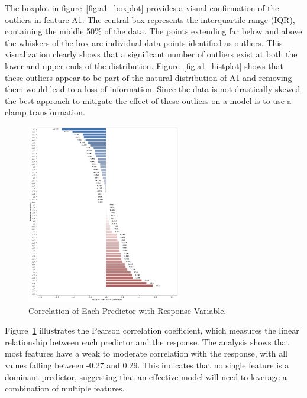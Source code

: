 \documentclass[11pt]{report}
\begin{document}
The boxplot in figure~\ref{fig:a1_boxplot} provides a visual confirmation of the outliers in feature A1. The central box represents the interquartile range (IQR), containing the middle 50\% of the data. The points extending far below and above the whiskers of the box are individual data points identified as outliers. This visualization clearly shows that a significant number of outliers exist at both the lower and upper ends of the distribution. Figure~\ref{fig:a1_histplot} shows that these outliers appear to be part of the natural distribution of A1 and removing them would lead to a loss of information. Since the data is not drastically skewed the best approach to mitigate the effect of these outliers on a model is to use a clamp transformation.

\begin{figure}[H]
    \centering
    \includegraphics[width=0.6\textwidth]{images/correlation_with_T.pdf}
    \caption{Correlation of Each Predictor with Response Variable.}
    \label{fig:correlation_with_T}
\end{figure}

Figure~\ref{fig:correlation_with_T} illustrates the Pearson correlation coefficient, which measures the linear relationship between each predictor and the response. The analysis shows that most features have a weak to moderate correlation with the response, with all values falling between -0.27 and 0.29. This indicates that no single feature is a dominant predictor, suggesting that an effective model will need to leverage a combination of multiple features.
\end{document}
